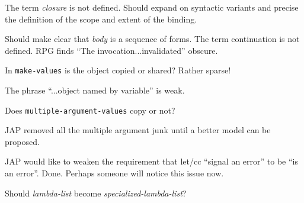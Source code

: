 \label{subsubsec:variable-binding}
%
\begin{optPrivate}
    The term {\em closure} is not defined.  Should expand on syntactic variants
    and precise the definition of the scope and extent of the binding.

    Should make clear that {\em body} is a sequence of forms.  The term
    continuation is not defined.  RPG finds ``The invocation...invalidated''
    obscure.

    In {\tt make-values} is the object copied or shared?  Rather sparse!

    The phrase ``...object named by variable'' is weak.

    Does {\tt multiple-argument-values} copy or not?

    JAP removed all the multiple argument junk until a better model can be
    proposed.

    JAP would like to weaken the requirement that let/cc ``signal an error'' to
    be ``is an error''.  Done.  Perhaps someone will notice this issue now.

    Should {\em lambda-list} become {\em specialized-lambda-list}?
\end{optPrivate}
%

